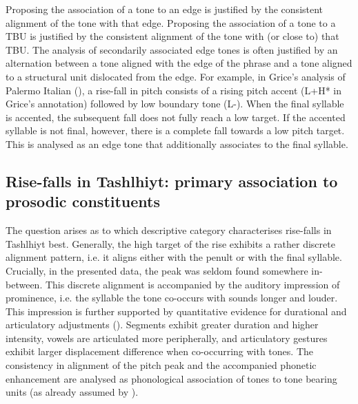 Proposing the association of a tone to an edge is justified by the consistent alignment of the tone with that edge. Proposing the association of a tone to a TBU is justified by the consistent alignment of the tone with (or close to) that TBU. The analysis of secondarily associated edge tones is often justified by an alternation between a tone aligned with the edge of the phrase and a tone aligned to a structural unit dislocated from the edge. For example, in Grice’s analysis of Palermo Italian (\citeyear{Grice1995}), a rise-fall in pitch consists of a rising pitch accent (L+H* in Grice’s annotation) followed by low boundary tone (L-). When the final syllable is accented, the subsequent fall does not fully reach a low target. If the accented syllable is not final, however, there is a complete fall towards a low pitch target. This is analysed as an edge tone that additionally associates to the final syllable. 

\subsection{Rise-falls in Tashlhiyt: primary association to prosodic constituents}
The question arises as to which descriptive category characterises rise-falls in Tashlhiyt best. Generally, the high target of the rise exhibits a rather discrete alignment pattern, i.e. it aligns either with the penult or with the final syllable. Crucially, in the presented data, the peak was seldom found somewhere in-between. This discrete alignment is accompanied by the auditory impression of prominence, i.e. the syllable the tone co-occurs with sounds longer and louder. This impression is further supported by quantitative evidence for durational and articulatory adjustments (\citealt{Diercks2011,GordonNafi2012,Grice.etal2015tash}). Segments exhibit greater duration and higher intensity, vowels are articulated more peripherally, and articulatory gestures exhibit larger displacement difference when co-occurring with tones. The consistency in alignment of the pitch peak and the accompanied phonetic enhancement are analysed as phonological association of tones to tone bearing units (as already assumed by \citealt{DE1985}).

